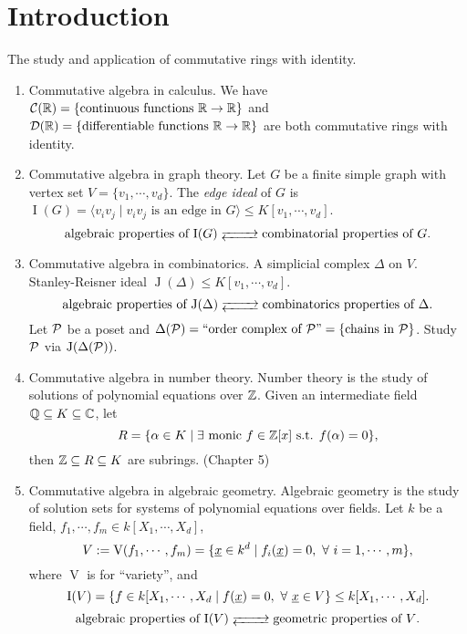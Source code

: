 \chapter*{Introduction}


The study and application of commutative rings with identity.
    \begin{enumerate}
        \item Commutative algebra in calculus. We have $\mathcal{C}(\mathbb{R}) = \{\text{continuous functions }\mathbb{R} \to \mathbb{R}\}$ and $\mathcal{D}(\mathbb{R}) = \{\text{differentiable functions }\mathbb{R} \to \mathbb{R}\}$ are both commutative rings with identity.
        \item Commutative algebra in graph theory. Let $G$ be a finite simple graph with vertex set $V = \{v_1,\cdots,v_d\}$. The \emph{edge ideal} of $G$ is $\operatorname{I}(G) = \langle v_iv_j \mid v_iv_j \text{ is an edge in }G \rangle \leq K[v_1,\cdots,v_d]$. 
            \[\text{algebraic properties of $\operatorname{I}(G)$} \myrightleftarrows{\rule{0.8cm}{0cm}} \text{combinatorial properties of $G$}.\]
        \item Commutative algebra in combinatorics.  A simplicial complex $\Delta$ on $V$. Stanley-Reisner ideal $\operatorname{J}(\Delta) \leq K[v_1,\cdots,v_d]$. 
            \[\text{algebraic properties of $\operatorname{J}(\Delta)$} \myrightleftarrows{\rule{0.8cm}{0cm}} \text{combinatorics properties of $\Delta$}.\]
            Let $\mathcal{P}$ be a poset and $\Delta(\mathcal{P}) = ``\text{order complex of $\mathcal{P}$''} = \{\text{chains in $\mathcal{P}$}\}$. Study $\mathcal{P}$ via $\operatorname{J}(\Delta(\mathcal{P}))$. 
        \item Commutative algebra in number theory. Number theory is the study of solutions of polynomial equations over $\mathbb{Z}$. Given an intermediate field $\mathbb{Q} \subseteq K \subseteq \mathbb{C}$, let 
            \[R = \{\alpha \in K \mid \exists \  \text{monic }f \in \mathbb{Z}[x] \text{ s.t. } f(\alpha) = 0\},\] 
            then $\mathbb{Z} \subseteq R \subseteq K$ are subrings. (Chapter 5)
        \item Commutative algebra in algebraic geometry. Algebraic geometry is the study of solution sets for systems of polynomial equations over fields. Let $k$ be a field, $f_1,\cdots,f_m \in k[X_1,\cdots,X_d]$, 
            \[V := \operatorname{V}(f_1,\cdots,f_m) = \{\underline x \in k^d \mid f_i(\underline x) = 0,\ \forall \  i = 1,\cdots,m\},\] 
            where $\operatorname{V}$ is for ``variety'', and 
            \[\operatorname{I}(V) = \{f \in k[X_1,\cdots,X_d \mid f(\underline x) = 0,\ \forall \  \underline x \in V\} \leq k[X_1,\cdots,X_d].\] 
            \[\text{algebraic properties of $\operatorname{I}(V)$} \myrightleftarrows{\rule{0.8cm}{0cm}} \text{geometric properties of $V$}.\]
    \end{enumerate}


